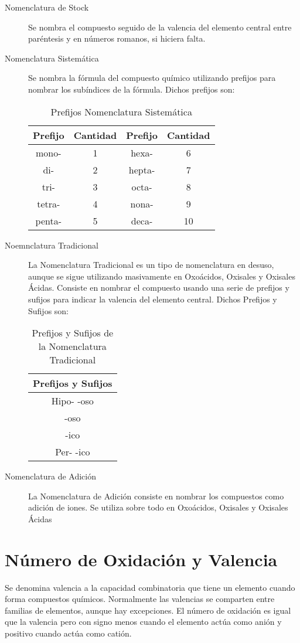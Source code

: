 \documentclass[11pt,fleqn]{book} %
\begin{document}
\begin{description}
	\item [Nomenclatura de Stock] Se nombra el compuesto seguido de la valencia del elemento central entre paréntesis y en números romanos, si hiciera falta.
	\item[Nomenclatura Sistemática] Se nombra la fórmula del compuesto químico utilizando prefijos para nombrar los subíndices de la fórmula. Dichos prefijos son:\\
	\begin{table}[h!]
		\centering
		\label{tab:nomsist}
		\begin{tabular}{c c|c c}
			Prefijo&Cantidad&Prefijo&Cantidad\\ \hline
			mono-&1&hexa-&6\\ 
			di-&2&hepta-&7\\ 
			tri-&3&octa-&8\\ 
			tetra-&4&nona-&9\\
			penta-&5&deca-&10\\ \hline
		\end{tabular}
		\caption{Prefijos Nomenclatura Sistemática}
	\end{table}
	\item[Noemnclatura Tradicional] La Nomenclatura Tradicional es un tipo de nomenclatura en desuso, aunque se sigue utilizando masivamente en Oxoácidos, Oxisales y Oxisales Ácidas. Consiste en nombrar el compuesto usando una serie de prefijos y sufijos para indicar la valencia del elemento central. Dichos Prefijos y Sufijos son:
	\begin{table}[h!]
		\centering
		\label{tab:nomtrad}
		\begin{tabular}{c}
			Prefijos y Sufijos\\ \hline
			Hipo- -oso\\
			-oso\\
			-ico\\
			Per- -ico\\ \hline
		\end{tabular}
	\caption{Prefijos y Sufijos de la Nomenclatura Tradicional}
	\end{table}
	\item[Nomenclatura de Adición] La Nomenclatura de Adición consiste en nombrar los compuestos como adición de iones. Se utiliza sobre todo en Oxoácidos, Oxisales y Oxisales Ácidas
\end{description}

\section{Número de Oxidación y Valencia}
	Se denomina valencia a la capacidad combinatoria que tiene un elemento cuando forma compuestos químicos. Normalmente las valencias se comparten entre familias de elementos, aunque  hay excepciones. El número de oxidación es igual que la valencia pero con signo menos cuando el elemento actúa como anión y positivo cuando actúa como catión.
\end{document}
